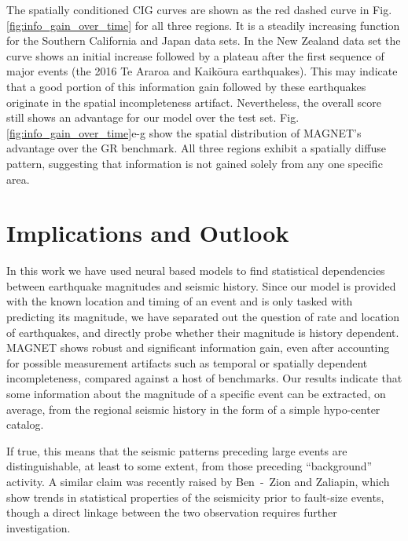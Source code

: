 \documentclass[pdflatex]{sn-jnl}
\begin{document}
The spatially conditioned CIG curves are shown as the red dashed curve in Fig. \ref{fig:info_gain_over_time} for all three regions. It is a steadily increasing function for the Southern California and Japan data sets. In the New Zealand data set the curve shows an initial increase followed by a plateau after the first sequence of major events (the 2016 Te Araroa and Kaikōura earthquakes). This may indicate that a good portion of this information gain followed by these earthquakes originate in the spatial incompleteness artifact. Nevertheless, the overall score still shows an advantage for our model over the test set. Fig. \ref{fig:info_gain_over_time}e-g show the spatial distribution of MAGNET's advantage over the GR benchmark. All three regions exhibit a spatially diffuse pattern, suggesting that information is not gained solely from any one specific area.


\section{Implications and Outlook}
In this work we have used neural based models to find statistical dependencies between earthquake magnitudes and seismic history. Since our model is provided with the known location and timing of an event and is only tasked with predicting its magnitude, we have separated out the question of rate and location of earthquakes, and directly probe whether their magnitude is history dependent. MAGNET shows robust and significant information gain, even after accounting for possible measurement artifacts such as temporal or spatially dependent incompleteness, compared against a host of benchmarks. Our results indicate that some information about the magnitude of a specific event can be extracted, on average, from the regional seismic history in the form of a simple hypo-center catalog. 


If true, this means that the seismic patterns preceding large events are distinguishable, at least to some extent, from those preceding ``background'' activity. A similar claim was recently raised by Ben~-~Zion and Zaliapin\cite{ben-zion_localization_2020}, which show trends in statistical properties of the seismicity prior to fault-size events, though a direct linkage between the two observation requires further investigation. 
\end{document}
